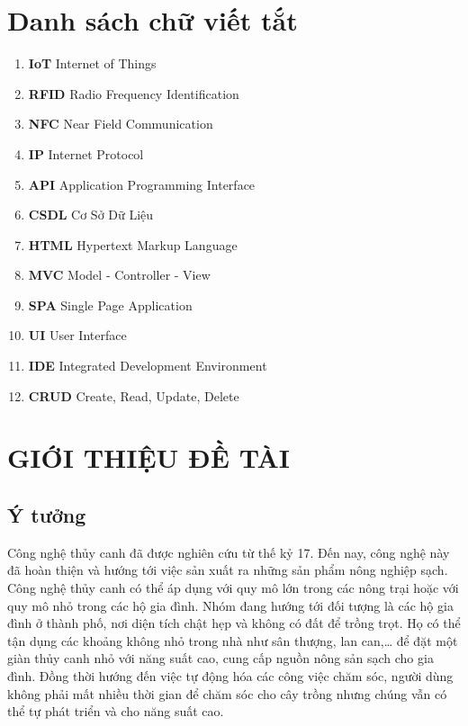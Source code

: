 \documentclass[a4paper,12pt,oneside]{article}
\begin{document}
\newpage
\tableofcontents

\newpage
\listoffigures

\newpage
\listoftables

\newpage
\section*{Danh sách chữ viết tắt}
\label{sec:dsvt}

\begin{enumerate}
\item \textbf{IoT} Internet of Things
\item \textbf{RFID} Radio Frequency Identification
\item \textbf{NFC} Near Field Communication
\item \textbf{IP} Internet Protocol
\item \textbf{API} Application Programming Interface
\item \textbf{CSDL} Cơ Sở Dữ Liệu
\item \textbf{HTML} Hypertext Markup Language
\item \textbf{MVC} Model - Controller - View
\item \textbf{SPA} Single Page Application
\item \textbf{UI} User Interface
\item \textbf{IDE} Integrated Development
 Environment
 \item \textbf{CRUD} Create, Read, Update, Delete
\end{enumerate}

\newpage
{}
\section{GIỚI THIỆU ĐỀ TÀI}

\subsection{Ý tưởng}

\noindent Công nghệ thủy canh đã được nghiên cứu từ thế kỷ 17. Đến nay, công nghệ này đã hoàn thiện và hướng tới việc sản xuất ra những sản phẩm nông nghiệp sạch. Công nghệ thủy canh có thể áp dụng với quy mô lớn trong các nông trại hoặc với quy mô nhỏ trong các hộ gia đình. Nhóm đang hướng tới đối tượng là các hộ gia đình ở thành phố, nơi diện tích chật hẹp và không có đất để trồng trọt. Họ có thể tận dụng các khoảng không nhỏ trong nhà như sân thượng, lan can,… để đặt một giàn thủy canh nhỏ với năng suất cao, cung cấp nguồn nông sản sạch cho gia đình. Đồng thời hướng đến việc tự động hóa các công việc chăm sóc, người dùng không phải mất nhiều thời gian để chăm sóc cho cây trồng nhưng chúng vẫn có thể tự phát triển và cho năng suất cao.
\end{document}
